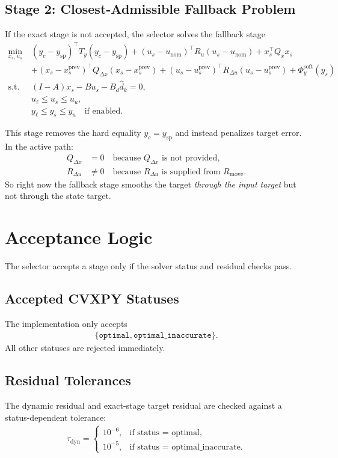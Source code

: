 \documentclass[11pt]{article}
\begin{document}
\subsection{Stage 2: Closest-Admissible Fallback Problem}
If the exact stage is not accepted, the selector solves the fallback stage
\begin{align}
\min_{x_s,u_s}
\;&
(y_c-y_{\mathrm{sp}})^\top T_y (y_c-y_{\mathrm{sp}})
+
(u_s-u_{\mathrm{nom}})^\top R_u (u_s-u_{\mathrm{nom}})
+
x_s^\top Q_x x_s \nonumber\\
&+
(x_s-x_s^{\mathrm{prev}})^\top Q_{\Delta x}(x_s-x_s^{\mathrm{prev}})
+
(u_s-u_s^{\mathrm{prev}})^\top R_{\Delta u}(u_s-u_s^{\mathrm{prev}})
+
\Phi_y^{\mathrm{soft}}(y_s) \\
\text{s.t. }\;&
(I-A)x_s - Bu_s - B_d\hat d_k = 0, \\
& u_{\ell} \le u_s \le u_u, \\
& y_{\ell} \le y_s \le y_u
\quad \text{if enabled.}
\end{align}

This stage removes the hard equality $y_c = y_{\mathrm{sp}}$ and instead penalizes target error. In the active path:
\begin{align}
Q_{\Delta x} &= 0
\quad \text{because } Q_{\Delta x} \text{ is not provided}, \\
R_{\Delta u} &\neq 0
\quad \text{because } R_{\Delta u} \text{ is supplied from } R_{\mathrm{move}}.
\end{align}
So right now the fallback stage smooths the target \emph{through the input target} but not through the state target.

\section{Acceptance Logic}
The selector accepts a stage only if the solver status and residual checks pass.

\subsection{Accepted CVXPY Statuses}
The implementation only accepts
\begin{align}
\{\texttt{optimal},\texttt{optimal\_inaccurate}\}.
\end{align}
All other statuses are rejected immediately.

\subsection{Residual Tolerances}
The dynamic residual and exact-stage target residual are checked against a status-dependent tolerance:
\begin{align}
\tau_{\mathrm{dyn}} =
\begin{cases}
10^{-6}, & \text{if status = optimal}, \\
10^{-5}, & \text{if status = optimal\_inaccurate}.
\end{cases}
\end{align}
\end{document}
